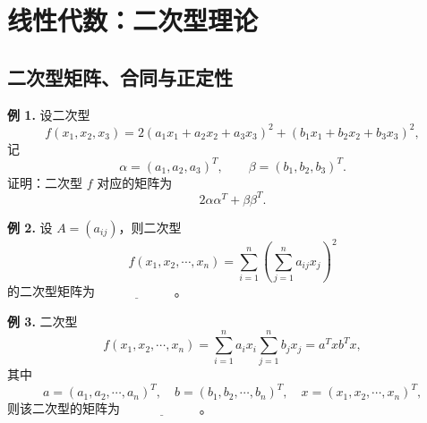\chapter{线性代数：二次型理论}

\section{二次型矩阵、合同与正定性}

\begin{problemblock}
\textbf{例 1.} 设二次型
\[
f(x_1,x_2,x_3)=2(a_1x_1+a_2x_2+a_3x_3)^2+(b_1x_1+b_2x_2+b_3x_3)^2,
\]
记
\[
\alpha=(a_1,a_2,a_3)^T,\qquad \beta=(b_1,b_2,b_3)^T.
\]
证明：二次型 \(f\) 对应的矩阵为
\[
2\alpha\alpha^T+\beta\beta^T.
\]
\end{problemblock}
\begin{solutionblock}
\end{solutionblock}

\begin{problemblock}
\textbf{例 2.} 设 \(A=(a_{ij})\)，则二次型
\[
f(x_1,x_2,\cdots,x_n)=\sum_{i=1}^n\left(\sum_{j=1}^n a_{ij}x_j\right)^2
\]
的二次型矩阵为 \(\underline{\hspace{6em}}\)。
\end{problemblock}
\begin{solutionblock}
\end{solutionblock}

\begin{problemblock}
\textbf{例 3.} 二次型
\[
f(x_1,x_2,\cdots,x_n)=\sum_{i=1}^n a_ix_i\sum_{j=1}^n b_jx_j=a^Txb^Tx,
\]
其中
\[
a=(a_1,a_2,\cdots,a_n)^T,\quad b=(b_1,b_2,\cdots,b_n)^T,\quad x=(x_1,x_2,\cdots,x_n)^T,
\]
则该二次型的矩阵为 \(\underline{\hspace{6em}}\)。
\end{problemblock}
\begin{solutionblock}
\end{solutionblock}

